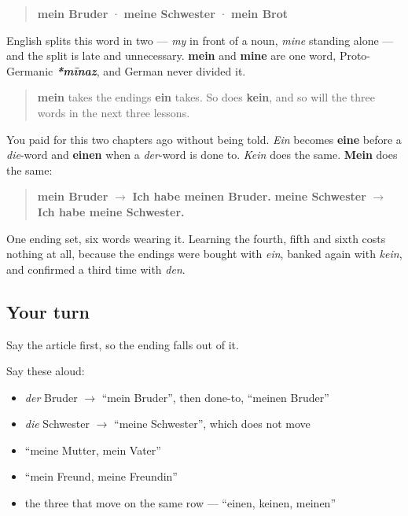 \begin{quote}
\textbf{mein Bruder} · \textbf{meine Schwester} · \textbf{mein Brot}
\end{quote}

English splits this word in two — \emph{my} in front of a noun, \emph{mine} standing alone — and the split is late and unnecessary. \textbf{mein} and \textbf{mine} are one word, Proto-Germanic \emph{\textbf{*mīnaz}}, and German never divided it.

\begin{grammarlens}[title={Grammar Lens: the family of six}]
\begin{quote}
\textbf{mein} takes the endings \textbf{ein} takes. So does \textbf{kein}, and so will the three words in the next three lessons.
\end{quote}

You paid for this two chapters ago without being told. \emph{Ein} becomes \textbf{eine} before a \emph{die}-word and \textbf{einen} when a \emph{der}-word is done to. \emph{Kein} does the same. \textbf{Mein} does the same:

\begin{quote}
\textbf{mein Bruder} $\to$ \textbf{Ich habe meinen Bruder.} \textbf{meine Schwester} $\to$ \textbf{Ich habe meine Schwester.}
\end{quote}

One ending set, six words wearing it. Learning the fourth, fifth and sixth costs nothing at all, because the endings were bought with \emph{ein}, banked again with \emph{kein}, and confirmed a third time with \emph{den}.
\end{grammarlens}

\subsection*{Your turn}
Say the article first, so the ending falls out of it.

Say these aloud:

\begin{itemize}
\raggedright
  \item \emph{der} Bruder $\to$ \textquotedblleft{}mein Bruder\textquotedblright{}, then done-to, \textquotedblleft{}meinen Bruder\textquotedblright{}
  \item \emph{die} Schwester $\to$ \textquotedblleft{}meine Schwester\textquotedblright{}, which does not move
  \item \textquotedblleft{}meine Mutter, mein Vater\textquotedblright{}
  \item \textquotedblleft{}mein Freund, meine Freundin\textquotedblright{}
  \item the three that move on the same row — \textquotedblleft{}einen, keinen, meinen\textquotedblright{}
\end{itemize}

